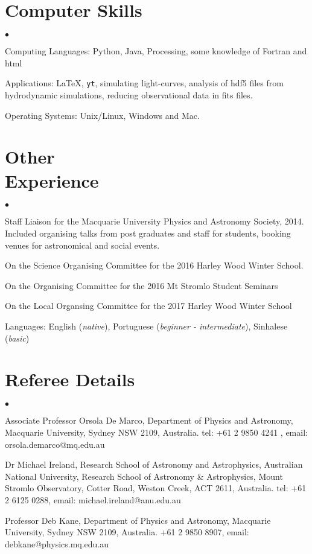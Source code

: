 \documentclass[margin,line]{res}
\newenvironment{list2}{
  \begin{list}{$\bullet$}{%
      \setlength{\itemsep}{0in}
      \setlength{\parsep}{0in} \setlength{\parskip}{0in}
      \setlength{\topsep}{0in} \setlength{\partopsep}{0in} 
      \setlength{\leftmargin}{0.2in}}}{\end{list}}
\begin{document}
\begin{resume}
\section{\sc Computer Skills} 
\begin{list2}
\item Computing Languages: Python, Java, Processing, some knowledge of Fortran and html
\item Applications: \LaTeX , \texttt{yt}, simulating light-curves, analysis of hdf5 files from hydrodynamic simulations, reducing observational data in fits files.  
\item Operating Systems:  Unix/Linux, Windows and Mac.\\ 
\end{list2}

\section{\sc Other \\ Experience}
\begin{list2}
\item Staff Liaison for the Macquarie University Physics and Astronomy Society, 2014. Included organising talks from post graduates and staff for students, booking venues for astronomical and social events.
\item On the Science Organising Committee for the 2016 Harley Wood Winter School.
\item On the Organising Committee for the 2016 Mt Stromlo Student Seminars
\item On the Local Organsing Committee for the 2017 Harley Wood Winter School
\item Languages: English (\emph{native}), Portuguese (\emph{beginner - intermediate}), Sinhalese (\emph{basic})
\end{list2}

\section{\sc Referee Details}
\begin{list2}
\item Associate Professor Orsola De Marco, Department of Physics and Astronomy, Macquarie University, Sydney NSW 2109, Australia. tel: +61 2 9850 4241 , email: orsola.demarco@mq.edu.au
\item Dr Michael Ireland, Research School of Astronomy and Astrophysics, Australian National University, Research School of Astronomy \& Astrophysics, Mount Stromlo Observatory, Cotter Road, Weston Creek, ACT 2611, Australia. tel: +61 2 6125 0288, email: michael.ireland@anu.edu.au 
\item Professor Deb Kane, Department of Physics and Astronomy, Macquarie University, Sydney NSW 2109, Australia. +61 2 9850 8907, email: debkane@physics.mq.edu.au
\end{list2}

\end{resume}
\end{document}
